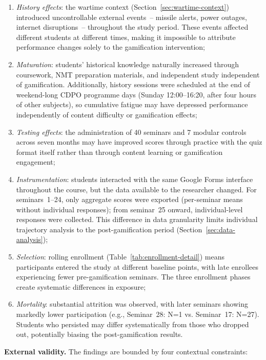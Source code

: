 \begin{enumerate}
\item \emph{History effects}: the wartime context (Section~\ref{sec:wartime-context}) introduced uncontrollable external events~-- missile alerts, power outages, internet disruptions~-- throughout the study period. These events affected different students at different times, making it impossible to attribute performance changes solely to the gamification intervention;
\item \emph{Maturation}: students' historical knowledge naturally increased through coursework, NMT preparation materials, and independent study independent of gamification. Additionally, history sessions were scheduled at the end of weekend-long CDPO programme days (Sunday 12:00--16:20, after four hours of other subjects), so cumulative fatigue may have depressed performance independently of content difficulty or gamification effects;
\item \emph{Testing effects}: the administration of 40 seminars and 7 modular controls across seven months may have improved scores through practice with the quiz format itself rather than through content learning or gamification engagement;
\item \emph{Instrumentation}: students interacted with the same Google Forms interface throughout the course, but the data available to the researcher changed. For seminars~1--24, only aggregate scores were exported (per-seminar means without individual responses); from seminar~25 onward, individual-level responses were collected. This difference in data granularity limits individual trajectory analysis to the post-gamification period (Section~\ref{sec:data-analysis});
\item \emph{Selection}: rolling enrollment (Table~\ref{tab:enrollment-detail}) means participants entered the study at different baseline points, with late enrollees experiencing fewer pre-gamification seminars. The three enrollment phases create systematic differences in exposure;
\item \emph{Mortality}: substantial attrition was observed, with later seminars showing markedly lower participation (e.g., Seminar~28: N=1 vs. Seminar~17: N=27). Students who persisted may differ systematically from those who dropped out, potentially biasing the post-gamification results.
\end{enumerate}

\textbf{External validity.} The findings are bounded by four contextual constraints:

